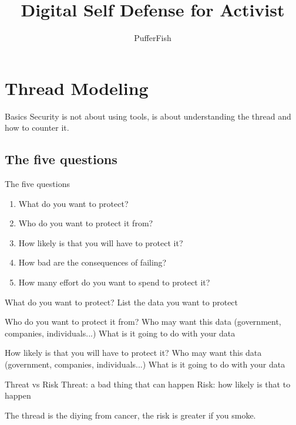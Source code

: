 \documentclass[11pt]{beamer}
\author{PufferFish}
\title{Digital Self Defense for Activist}
\begin{document}
\begin{frame}
\titlepage
\end{frame}

\begin{frame}
\tableofcontents
\end{frame}
\section{Thread Modeling}
\begin{frame}{Basics}
Security is not about using tools, is about understanding the thread and how to counter it.
\end{frame}
\subsection{The five questions}
\begin{frame}{The five questions}
\begin{enumerate}
\item What do you want to protect?
\item Who do you want to protect it from?
\item How  likely is that you will have to protect it?
\item How bad are the consequences of failing?
\item How many effort do you want to spend to protect it?
\end{enumerate}
\end{frame}
\begin{frame}{What do you want to protect?}
List the  data  you want to  protect
\end{frame}
\begin{frame}{Who do you want to protect it from?}
Who may want this data (government, companies, individuals...)
What is it going to do with your data
\end{frame}
\begin{frame}{How  likely is that you will have to protect it?}
Who may want this data (government, companies, individuals...)
What is it going to do with your data
\end{frame}
\begin{frame}{Threat vs Risk}
Threat: a bad thing that can happen
Risk: how likely is that to happen

The thread is the diying from cancer, the risk is greater if you smoke.
\end{frame}
\end{document}
